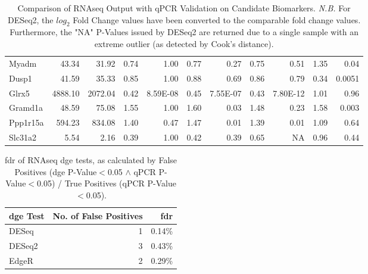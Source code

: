 \begin{sidewaystable}[]
\begin{tabular}{lrrrrrrrr|rr}
\hline
 Myadm             & 43.34                 & 31.92                 & 0.74        & 1.00             & 0.77          & 0.27               & 0.75           & 0.51                & 1.35  & 0.04 \\
 Dusp1             & 41.59                 & 35.33                 & 0.85        & 1.00             & 0.88          & 0.69               & 0.86           & 0.79                & 0.34  & 0.0051 \\
 Glrx5             & 4888.10               & 2072.04               & 0.42        & 8.59E-08         & 0.45          & 7.55E-07           & 0.43           & 7.80E-12            & 1.01  & 0.96 \\
 Gramd1a           & 48.59                 & 75.08                 & 1.55        & 1.00             & 1.60          & 0.03               & 1.48           & 0.23                & 1.58  & 0.003 \\
 Ppp1r15a          & 594.23                & 834.08                & 1.40        & 0.47             & 1.47          & 0.01               & 1.39           & 0.01                & 1.09  & 0.64 \\
 Slc31a2           & 5.54                  & 2.16                  & 0.39        & 1.00             & 0.42          & 0.39               & 0.65           & NA                  & 0.96  & 0.44
\end{tabular}
\caption[Comparison of RNAseq Output with qPCR Validation on Candidate Biomarkers]{Comparison of RNAseq Output with qPCR Validation on Candidate Biomarkers. \textit{N.B.} For DESeq2, the $log_{2}$ Fold Change values have been converted to the comparable fold change values. Furthermore, the "NA" P-Values issued by DESeq2 are returned due to a single sample with an extreme outlier (as detected by Cook's distance). }
\label{tab:RNAseqvsqPCR}
\end{sidewaystable}

\begin{table}[!htbp]
\small
\centering
\begin{tabular}{lrr}
\textbf{\acrshort{dge} Test} & \textbf{No. of False Positives} & \textbf{\acrfull{fdr}} \\
\hline
DESeq & 1 & 0.14\% \\
DESeq2  & 3 & 0.43\% \\
EdgeR & 2 & 0.29\% \\
\end{tabular}
\caption[\acrfull{fdr} of RNAseq \acrfull{dge} tests.]{\acrfull{fdr} of RNAseq \acrfull{dge} tests, as calculated by False Positives (\acrshort{dge} P-Value$<$0.05 $\land$ qPCR P-Value$<$0.05) / True Positives (qPCR P-Value$<$0.05).}
\label{tab:fdr}	
\end{table}

